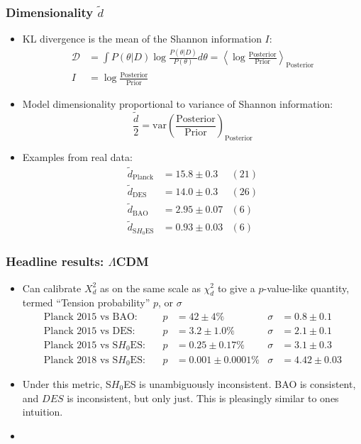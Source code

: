 \documentclass[%
]{beamer}
\begin{document}
\begin{frame}
    \frametitle{Dimensionality $\tilde{d}$}
    \begin{itemize}
        \item KL divergence is the mean of the Shannon information $I$:
            \begin{align}
                \mathcal{D} &= \int P(\theta|D) \log \frac{P(\theta|D)}{P(\theta)} d\theta = \left\langle\log\frac{\text{Posterior}}{\text{Prior}}\right\rangle_\text{Posterior}\nonumber\\
                I &= \log\frac{\text{Posterior}}{\text{Prior}}\nonumber
            \end{align}
        \item Model dimensionality proportional to variance of Shannon information:
            \[
                \frac{\tilde{d}}{2} = \text{var}\left(\frac{\text{Posterior}}{\text{Prior}}\right)_\text{Posterior}
            \]
        \item Examples from real data:
            \begin{align}
                \tilde{d}_\text{Planck} &= 15.8 \pm  0.3 &(21) \nonumber\\
                \tilde{d}_\text{DES} &= 14.0 \pm  0.3 &(26) \nonumber\\
                \tilde{d}_\text{BAO} &= 2.95 \pm  0.07 &(6) \nonumber\\
                \tilde{d}_\text{S$H_0$ES} &= 0.93 \pm  0.03 &(6) \nonumber
            \end{align}
    \end{itemize}

\end{frame}

\begin{frame}
    \frametitle{Headline results: $\Lambda$CDM}
    \begin{itemize}
        \item Can calibrate $X^2_d$ as on the same scale as $\chi^2_d$ to give a $p$-value-like quantity, termed ``Tension probability'' $p$, or $\sigma$
            \begin{align}
                \text{Planck 2015 vs BAO}:&      &p&=  42 \pm     4 \%        &\sigma& = 0.8\pm0.1\nonumber\\
                \text{Planck 2015 vs DES}:&      &p&=   3.2 \pm     1.0 \%    &\sigma& = 2.1\pm0.1\nonumber\\
                \text{Planck 2015 vs S$H_0$ES}:& &p&=   0.25 \pm     0.17 \%  &\sigma& = 3.1\pm0.3 \nonumber\\
                \text{Planck 2018 vs S$H_0$ES}:& &p&=   0.001 \pm     0.0001 \%  &\sigma& = 4.42\pm0.03\nonumber
            \end{align}
        \item Under this metric, S$H_0$ES is unambiguously inconsistent. BAO is consistent, and $DES$ is inconsistent, but only just. This is pleasingly similar to ones intuition.
		\item {}
    \end{itemize}
\end{frame}
\end{document}
